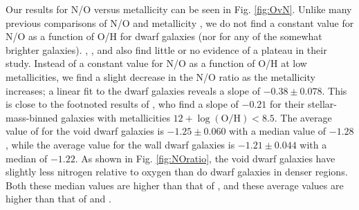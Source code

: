 Our results for N/O versus metallicity can be seen in Fig. \ref{fig:OvN}.  
Unlike many previous comparisons of N/O and metallicity 
\citep[for example,][]{VilaCostas93, Thuan95, Henry00, Pilyugin02, Lee04, 
Pilyugin04, Nava06, vanZee06a, PerezMontero09, Amorin10, Berg12}, we do not find 
a constant value for N/O as a function of O/H for dwarf galaxies (nor for any of 
the somewhat brighter galaxies).  \cite{Shields91}, \cite{Contini02}, and 
\cite{Nicholls14b} also find little or no evidence of a plateau in their study.  
Instead of a constant value for N/O as a function of O/H at low metallicities, 
we find a slight decrease in the N/O ratio as the metallicity increases; a 
linear fit to the dwarf galaxies reveals a slope of $-0.38\pm 0.078$.  This is 
close to the footnoted results of \cite{Andrews13}, who find a slope of $-0.21$ 
for their stellar-mass-binned galaxies with metallicities 
$12 + \log (\text{O}/\text{H}) < 8.5$.  The average value of \NO for the void 
dwarf galaxies is $-1.25\pm 0.060$ with a median value of $-1.28$, while the 
average value for the wall dwarf galaxies is $-1.21\pm 0.044$ with a median of 
$-1.22$.  As shown in Fig. \ref{fig:NOratio}, the void dwarf galaxies have 
slightly less nitrogen relative to oxygen than do dwarf galaxies in denser 
regions.  Both these median values are higher than that of \cite{Andrews13}, and 
these average values are higher than that of \cite{Izotov99} and \cite{Nava06}.  


